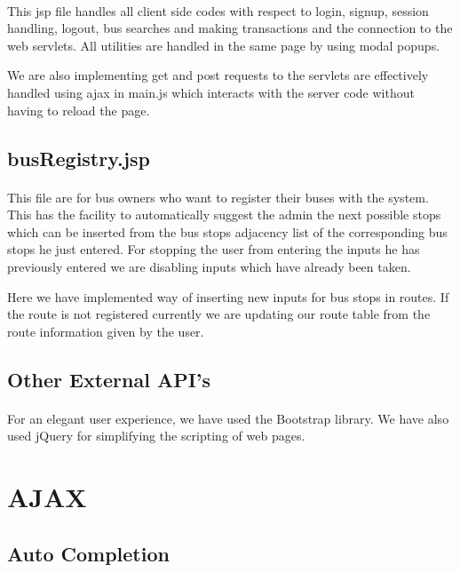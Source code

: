\documentclass[11pt]{article}
\begin{document}
\paragraph{}

This jsp file handles all client side codes with respect to login, signup, session handling, logout, bus searches and making transactions and  the  connection to the web servlets. All utilities are handled in the same page by using modal popups. 

We are also implementing get and post requests to the servlets are effectively handled using ajax in main.js which interacts with the server code without having to reload the page. 


\subsection{busRegistry.jsp}
\paragraph{}

This file are for bus owners who want to register their buses with the system. This has the facility to automatically suggest the admin the next possible stops which can be inserted from the bus stops adjacency list of the corresponding bus stops he just entered. For stopping the user from entering the inputs he has previously entered we are disabling inputs which have already been taken.  

Here we have implemented way of inserting  new inputs for bus stops in routes. If the route is not registered currently we are updating our route table from the route information given by the user.


\subsection{Other External API's}
\paragraph{}
For an elegant user experience, we have used the Bootstrap \cite{bstrap} library. We have also used jQuery\cite{jquery} for simplifying the scripting of web pages.

\section{AJAX}

\subsection{Auto Completion} 
\end{document}
